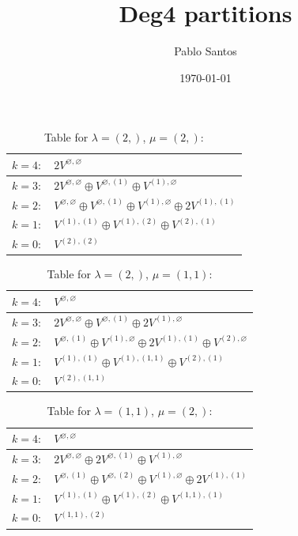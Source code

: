 \documentclass[a4paper,12pt]{article}
\title{Deg4 partitions}
\author{Pablo Santos}
\date{\today}
\begin{document}
\renewcommand{\arraystretch}{1.6} 
\begin{table}[H]
\centering
\caption{Table for $\lambda = (2,)$, $\mu = (2,)$:}
\begin{tabular}{|>{\centering\arraybackslash}p{15cm}|}
\hline
 $k = 4: \quad 2 V^{\varnothing, \varnothing} $ \\ \hline
 $k = 3: \quad 2 V^{\varnothing, \varnothing} \oplus V^{\varnothing, (1)} \oplus V^{(1), \varnothing} $ \\ \hline
 $k = 2: \quad V^{\varnothing, \varnothing} \oplus V^{\varnothing, (1)} \oplus V^{(1), \varnothing} \oplus 2 V^{(1), (1)} $ \\ \hline
 $k = 1: \quad V^{(1), (1)} \oplus V^{(1), (2)} \oplus V^{(2), (1)} $ \\ \hline
 $k = 0: \quad V^{(2), (2)} $ \\ \hline
\end{tabular}
\end{table}

\renewcommand{\arraystretch}{1.6} 
\begin{table}[H]
\centering
\caption{Table for $\lambda = (2,)$, $\mu = (1, 1)$:}
\begin{tabular}{|>{\centering\arraybackslash}p{15cm}|}
\hline
 $k = 4: \quad V^{\varnothing, \varnothing} $ \\ \hline
 $k = 3: \quad 2 V^{\varnothing, \varnothing} \oplus V^{\varnothing, (1)} \oplus 2 V^{(1), \varnothing} $ \\ \hline
 $k = 2: \quad V^{\varnothing, (1)} \oplus V^{(1), \varnothing} \oplus 2 V^{(1), (1)} \oplus V^{(2), \varnothing} $ \\ \hline
 $k = 1: \quad V^{(1), (1)} \oplus V^{(1), (1, 1)} \oplus V^{(2), (1)} $ \\ \hline
 $k = 0: \quad V^{(2), (1, 1)} $ \\ \hline
\end{tabular}
\end{table}

\renewcommand{\arraystretch}{1.6} 
\begin{table}[H]
\centering
\caption{Table for $\lambda = (1, 1)$, $\mu = (2,)$:}
\begin{tabular}{|>{\centering\arraybackslash}p{15cm}|}
\hline
 $k = 4: \quad V^{\varnothing, \varnothing} $ \\ \hline
 $k = 3: \quad 2 V^{\varnothing, \varnothing} \oplus 2 V^{\varnothing, (1)} \oplus V^{(1), \varnothing} $ \\ \hline
 $k = 2: \quad V^{\varnothing, (1)} \oplus V^{\varnothing, (2)} \oplus V^{(1), \varnothing} \oplus 2 V^{(1), (1)} $ \\ \hline
 $k = 1: \quad V^{(1), (1)} \oplus V^{(1), (2)} \oplus V^{(1, 1), (1)} $ \\ \hline
 $k = 0: \quad V^{(1, 1), (2)} $ \\ \hline
\end{tabular}
\end{table}
\end{document}
